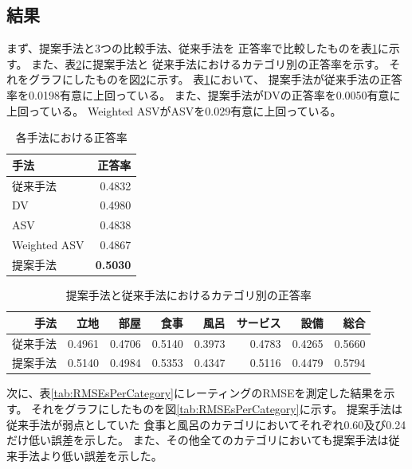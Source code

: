 \subsection{結果}

まず、提案手法と3つの比較手法、従来手法\cite{fujitani15}を
正答率で比較したものを表\ref{tab:AccuraciesOfMethods}に示す。
また、表\ref{tab:AccuraciesPerCategory}に提案手法と
従来手法\cite{fujitani15}におけるカテゴリ別の正答率を示す。
それをグラフにしたものを図\ref{tab:AccuraciesPerCategory}に示す。
表\ref{tab:AccuraciesOfMethods}において、
提案手法が従来手法\cite{fujitani15}の正答率を0.0198有意に上回っている。
また、提案手法がDVの正答率を0.0050有意に上回っている。
Weighted ASVがASVを0.029有意に上回っている。

\begin{table}
  \caption{各手法における正答率}
  \centering
  \begin{tabular}{l | r} \label{tab:AccuraciesOfMethods}
    手法 & 正答率 \\
    \hline
    従来手法\cite{fujitani15} & 0.4832 \\
    DV & 0.4980 \\
    ASV & 0.4838 \\
    Weighted ASV & 0.4867 \\
    提案手法 & \textbf{0.5030} \\
  \end{tabular}
\end{table}

\begin{table}
  \caption{提案手法と従来手法\cite{fujitani15}におけるカテゴリ別の正答率}
  \centering
  \begin{tabular}{r | r r r r r r r} \label{tab:AccuraciesPerCategory}
    手法 & 立地 & 部屋 & 食事 & 風呂 & サービス & 設備 & 総合 \\
    \hline
    従来手法\cite{fujitani15}
        & 0.4961 & 0.4706 & 0.5140 & 0.3973 & 0.4783 & 0.4265 & 0.5660 \\
    提案手法 & 0.5140 & 0.4984 & 0.5353 & 0.4347 & 0.5116 & 0.4479 & 0.5794 \\
  \end{tabular}
\end{table}

次に、表\ref{tab:RMSEsPerCategory}にレーティングのRMSEを測定した結果を示す。
それをグラフにしたものを図\ref{tab:RMSEsPerCategory}に示す。
提案手法は従来手法\cite{fujitani15}が弱点としていた
食事と風呂のカテゴリにおいてそれぞれ0.60及び0.24だけ低い誤差を示した。
また、その他全てのカテゴリにおいても提案手法は従来手法より低い誤差を示した。

